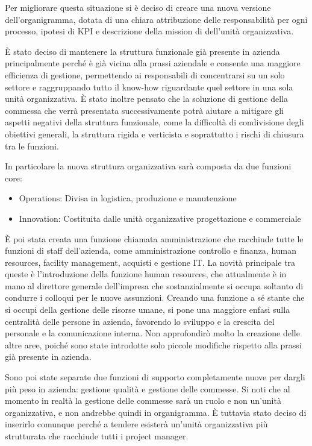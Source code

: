 \begin{multicols}{2}
	Per migliorare questa situazione si è deciso di creare una nuova versione dell'organigramma, dotata di una chiara attribuzione delle responsabilità per ogni processo, ipotesi di KPI e descrizione della mission di dell'unità organizzativa.

	È stato deciso di mantenere la struttura funzionale già presente in azienda principalmente perché è già vicina alla prassi aziendale e consente una maggiore efficienza di gestione, permettendo ai responsabili di concentrarsi su un solo settore e raggruppando tutto il know-how riguardante quel settore in una sola unità organizzativa. È stato inoltre pensato che la soluzione di gestione della commessa che verrà presentata successivamente potrà aiutare a mitigare gli aspetti negativi della struttura funzionale, come la difficoltà di condivisione degli obiettivi generali, la struttura rigida e verticista e soprattutto i rischi di chiusura tra le funzioni.

	In particolare la nuova struttura organizzativa sarà composta da due funzioni core:

	\begin{itemize}
		\item Operations: Divisa in logistica, produzione e manutenzione
		\item Innovation: Costituita dalle unità organizzative progettazione e commerciale
	\end{itemize}

	È poi stata creata una funzione chiamata amministrazione che racchiude tutte le funzioni di staff dell’azienda, come amministrazione controllo e finanza, human resources, facility management, acquisti e gestione IT.
  La novità principale tra queste è l'introduzione della funzione human resources, che attualmente è in mano al direttore generale dell'impresa che sostanzialmente si occupa soltanto di condurre i colloqui per le nuove assunzioni.
  Creando una funzione a sé stante che si occupi della gestione delle risorse umane, si pone una maggiore enfasi sulla centralità delle persone in azienda, favorendo lo sviluppo e la crescita del personale e la comunicazione interna. 
	Non approfondirò molto la creazione delle altre aree, poiché sono state introdotte solo piccole modifiche rispetto alla prassi già presente in azienda.

	Sono poi state separate due funzioni di supporto completamente nuove per dargli più peso in azienda: gestione qualità e gestione delle commesse. Si noti che al momento in realtà la gestione delle commesse sarà un ruolo e non un'unità organizzativa, e non andrebbe quindi in organigramma. È tuttavia stato deciso di inserirlo comunque perché a tendere esisterà un'unità organizzativa più strutturata che racchiude tutti i project manager.
\end{multicols}

